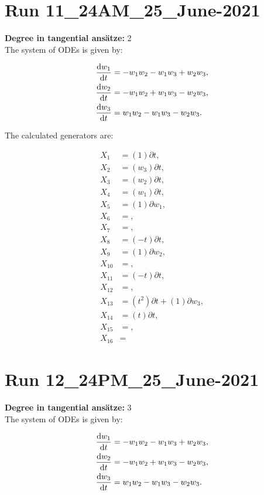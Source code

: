 \section*{Run 11\_24AM\_25\_June-2021}
\textbf{Degree in tangential ansätze:}	2\\
The system of ODEs is given by:

\begin{align*}
\dv{w_{1}}{t}&=- w_{1} w_{2} - w_{1} w_{3} + w_{2} w_{3},\\
\dv{w_{2}}{t}&=- w_{1} w_{2} + w_{1} w_{3} - w_{2} w_{3},\\
\dv{w_{3}}{t}&=w_{1} w_{2} - w_{1} w_{3} - w_{2} w_{3}.\\
\end{align*}

\noindent The calculated generators are:

\begin{align*}
X_{1}&=\left( 1 \right)\partial t,\\
X_{2}&=\left( w_{3} \right)\partial t,\\
X_{3}&=\left( w_{2} \right)\partial t,\\
X_{4}&=\left( w_{1} \right)\partial t,\\
X_{5}&=\left( 1 \right)\partial w_{1},\\
X_{6}&=,\\
X_{7}&=,\\
X_{8}&=\left( - t \right)\partial t,\\
X_{9}&=\left( 1 \right)\partial w_{2},\\
X_{10}&=,\\
X_{11}&=\left( - t \right)\partial t,\\
X_{12}&=,\\
X_{13}&=\left( t^{2} \right)\partial t+\left( 1 \right)\partial w_{3},\\
X_{14}&=\left( t \right)\partial t,\\
X_{15}&=,\\
X_{16}&=\end{align*}
\section*{Run 12\_24PM\_25\_June-2021}
\textbf{Degree in tangential ansätze:}	3\\
The system of ODEs is given by:

\begin{align*}
\dv{w_{1}}{t}&=- w_{1} w_{2} - w_{1} w_{3} + w_{2} w_{3},\\
\dv{w_{2}}{t}&=- w_{1} w_{2} + w_{1} w_{3} - w_{2} w_{3},\\
\dv{w_{3}}{t}&=w_{1} w_{2} - w_{1} w_{3} - w_{2} w_{3}.\\
\end{align*}


